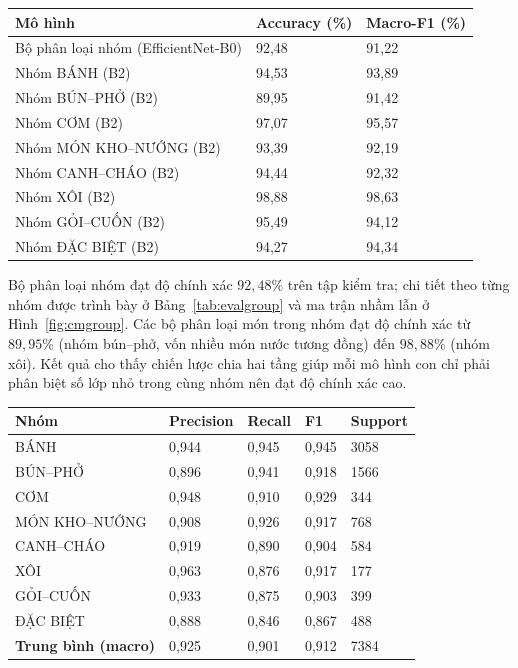 \documentclass[../DoAn.tex]{subfiles}
\begin{document}
\begin{center}
\label{tab:eval}
\begin{tabular}{|p{6.5cm}|p{3.2cm}|p{3.2cm}|}\hline
\textbf{Mô hình} & \textbf{Accuracy (\%)} & \textbf{Macro-F1 (\%)} \\ \hline
Bộ phân loại nhóm (EfficientNet-B0) & 92,48 & 91,22 \\ \hline
Nhóm BÁNH (B2) & 94,53 & 93,89 \\ \hline
Nhóm BÚN--PHỞ (B2) & 89,95 & 91,42 \\ \hline
Nhóm CƠM (B2) & 97,07 & 95,57 \\ \hline
Nhóm MÓN KHO--NƯỚNG (B2) & 93,39 & 92,19 \\ \hline
Nhóm CANH--CHÁO (B2) & 94,44 & 92,32 \\ \hline
Nhóm XÔI (B2) & 98,88 & 98,63 \\ \hline
Nhóm GỎI--CUỐN (B2) & 95,49 & 94,12 \\ \hline
Nhóm ĐẶC BIỆT (B2) & 94,27 & 94,34 \\ \hline
\end{tabular}
\end{center}

Bộ phân loại nhóm đạt độ chính xác $92{,}48\%$ trên tập kiểm tra; chi tiết theo từng nhóm được trình bày ở Bảng~\ref{tab:evalgroup} và ma trận nhầm lẫn ở Hình~\ref{fig:cmgroup}. Các bộ phân loại món trong nhóm đạt độ chính xác từ $89{,}95\%$ (nhóm bún--phở, vốn nhiều món nước tương đồng) đến $98{,}88\%$ (nhóm xôi). Kết quả cho thấy chiến lược chia hai tầng giúp mỗi mô hình con chỉ phải phân biệt số lớp nhỏ trong cùng nhóm nên đạt độ chính xác cao.

\begin{center}
\label{tab:evalgroup}
\begin{tabular}{|p{4.2cm}|p{2.4cm}|p{2.4cm}|p{2.2cm}|p{1.8cm}|}\hline
\textbf{Nhóm} & \textbf{Precision} & \textbf{Recall} & \textbf{F1} & \textbf{Support} \\ \hline
BÁNH & 0,944 & 0,945 & 0,945 & 3058 \\ \hline
BÚN--PHỞ & 0,896 & 0,941 & 0,918 & 1566 \\ \hline
CƠM & 0,948 & 0,910 & 0,929 & 344 \\ \hline
MÓN KHO--NƯỚNG & 0,908 & 0,926 & 0,917 & 768 \\ \hline
CANH--CHÁO & 0,919 & 0,890 & 0,904 & 584 \\ \hline
XÔI & 0,963 & 0,876 & 0,917 & 177 \\ \hline
GỎI--CUỐN & 0,933 & 0,875 & 0,903 & 399 \\ \hline
ĐẶC BIỆT & 0,888 & 0,846 & 0,867 & 488 \\ \hline
\textbf{Trung bình (macro)} & 0,925 & 0,901 & 0,912 & 7384 \\ \hline
\end{tabular}
\end{center}
\end{document}
